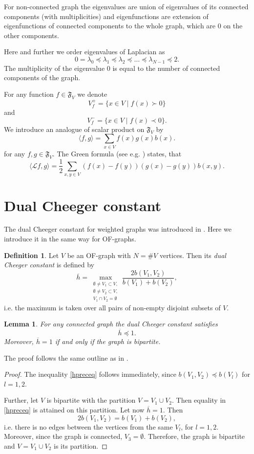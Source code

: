 \documentclass[a4paper,12pt]{amsart}
\newtheorem{lemma}{Lemma}
\theoremstyle{definition}
\newtheorem{definition}{Definition}
\renewcommand{\L}{\mathcal{L}}
\newcommand{\F}{\mathfrak{F}}
\begin{document}
For non-connected graph the eigenvalues are union of eigenvalues of its connected components (with multiplicities) and eigenfunctions are extension of eigenfunctions of connected components to the whole graph, which are $0$ on the other components.

Here and further we order eigenvalues of Laplacian as 
$$
0=\lambda_0\preceq \lambda_1\preceq\lambda_2\preceq \dots \preceq \lambda_{N-1}\preceq 2.
$$
 The multiplicity of the eigenvalue $0$ is equal to the number of connected components of the graph.

For any function $f\in \mathfrak F_V$ we denote  
$$
V_f^+=\{x\in V\mid f(x)\succ 0\}
$$ 
and
$$
V_f^-=\{x\in V\mid f(x)\prec 0\}.
$$
We introduce an analogue of scalar product on $\F_V$ by 
$$
\langle f,g\rangle=\sum_{x\in V}f(x)g(x)b(x).
$$
for any $f,g \in \F_V$.
The Green formula (see e.g. \cite{Muranova1}) states, that  
$$
\langle \L f,g\rangle=\dfrac{1}{2}\sum_{x,y\in V}(f(x)-f(y))(g(x)-g(y))b(x,y).
$$

\section{Dual Cheeger constant}
The dual Cheeger constant for weighted graphs was introduced in \cite{BauerJost}. Here we introduce it in the same way for OF-graphs.
\begin{definition}
Let $V$ be an OF-graph with $N=\#V$ vertices. Then its {\em dual Cheeger constant} is defined by
\begin{equation}\label{dualCheeger}
\overline h=\max_{\substack{\emptyset \ne V_1\subset V,\\ \emptyset \ne V_2\subset V,\\V_1\cap V_2=\emptyset}}\dfrac{2b(V_1,V_2)}{b(V_1)+b(V_2)},
\end{equation}
i.e. the maximum is taken over all pairs of non-empty disjoint subsets of $V$.
\end{definition}

\begin{lemma}
For any connected graph the dual Cheeger constant satisfies
\begin{equation}\label{hpreceq}
\overline h\preceq 1.
\end{equation}
Moreover, $\overline h=1$ if and only if the graph is bipartite.
\end{lemma}
The proof follows the same outline as in \cite{BauerJost}.
\begin{proof}
 The inequality \eqref{hpreceq} follows immediately, since $b(V_1,V_2)\preceq b(V_l)$ for $l=1,2.$

Further, let $V$ is bipartite with the partition $V=V_1\cup V_2$. Then equality in \eqref{hpreceq} is attained on this partition. 
Let now $\overline h=1$. Then 
$$
2b(V_1,V_2)=b(V_1)+b(V_2),
$$
i.e. there is no edges between the vertices from the same $V_l$, for $l=1,2$. Moreover, since the graph is connected, $V_3=\emptyset$. Therefore, the graph is bipartite and $V=V_1\cup V_2$ is its partition.
\end{proof}
\end{document}

